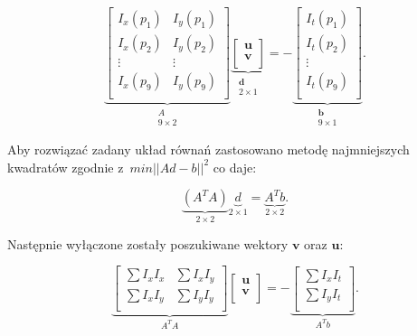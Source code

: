         \[
          \underbrace{
            \begin{bmatrix}
              I_{x}(p_{1}) & I_{y}(p_{1}) \\
              I_{x}(p_{2}) & I_{y}(p_{2}) \\
              \vdots       & \vdots       \\
              I_{x}(p_{9}) & I_{y}(p_{9}) \\
            \end{bmatrix}}_{\substack{A\\9\times2}}
          \underbrace{
            \begin{bmatrix}
              \mathbf{u} \\
              \mathbf{v} \\
            \end{bmatrix}}_{\substack{\mathbf{d}\\2\times1}} =
          -\underbrace{
            \begin{bmatrix}
              I_{t}(p_{1}) \\
              I_{t}(p_{2}) \\
              \vdots       \\
              I_{t}(p_{9}) \\
            \end{bmatrix}}_{\substack{\mathbf{b}\\9\times1}}.
        \]

      Aby rozwiązać zadany układ równań zastosowano metodę najmniejszych kwadratów zgodnie z~$min||Ad - b||^{2}$ co daje:

        \[
          \underbrace{(A^{T}A)}_{2\times2} \underbrace{d}_{2\times1} = \underbrace{A^{T}b}_{2\times2}.
        \]

      Następnie wyłączone zostały poszukiwane wektory $\mathbf{v}$ oraz $\mathbf{u}$:

        \[
          \underbrace{
            \begin{bmatrix}
              \sum I_{x} I_{x} & \sum I_{x} I_{y} \\
              \sum I_{x} I_{y} & \sum I_{y} I_{y} \\
            \end{bmatrix}
          }_{A^{T}A}
          \begin{bmatrix}
            \mathbf{u} \\
            \mathbf{v} \\
          \end{bmatrix} =
          -\underbrace{
            \begin{bmatrix}
              \sum I_{x} I_{t} \\
              \sum I_{y} I_{t} \\
            \end{bmatrix}
          }_{A^{T}b}.
        \]

